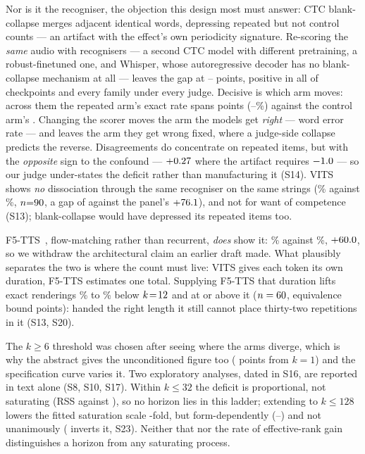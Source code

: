 Nor is it the recogniser, the objection this design most must answer: CTC
blank-collapse merges adjacent identical words, depressing repeated but not
control counts --- an artifact with the effect's own periodicity signature. Re-scoring the \emph{same} audio with
\IndNJudges{} recognisers --- a second CTC model with different
pretraining, a robust-finetuned one, and Whisper, whose autoregressive decoder
has no blank-collapse mechanism at all --- leaves the gap at
\IndGapLo{}--\IndGapHi{} points, positive in all \IndNCkPos{} of \IndNCk{}
checkpoints and every family under every judge. Decisive is which arm moves:
across them the repeated arm's exact rate spans \IndRepSpread{} points
(\IndRepLo{}--\IndRepHi{}\%) against the control arm's \IndCtlSpread{}.
Changing the scorer moves the arm the models get \emph{right} --- word error
rate --- and leaves the arm they get wrong fixed, where a judge-side collapse
predicts the reverse. Disagreements do concentrate on repeated items, but with
the \emph{opposite} sign to the confound --- $+0.27{}$ where the artifact
requires $-1.0{}$ --- so our judge under-states the deficit rather
than manufacturing it (S14). VITS~\cite{kim2021vits} shows \emph{no} dissociation
through the same recogniser on the same strings (\VitsRep{}\% against
\VitsCtl{}\%, $n{=}90{}$, a gap of \VitsGap{} against the panel's
$+76.1{}$), and not for want of competence (S13); blank-collapse would
have depressed its repeated items too.

F5-TTS~\cite{chen2024f5tts}, flow-matching rather than recurrent, \emph{does}
show it: \FivettsRep{}\% against \FivettsCtl{}\%, $+60.0{}$, so we
withdraw the architectural claim an earlier draft made. What plausibly separates
the two is where the count must live: VITS gives each token its own duration,
F5-TTS estimates one total. Supplying F5-TTS that duration lifts exact
renderings \DurLoFree{}\% to \DurLoFixed{}\% below $k\!=\!12{}$ and
\DurHiGain{} at or above it ($n=60{}$, equivalence bound
\EqDurBound{} points): handed the right length it still cannot place thirty-two repetitions
in it (S13, S20).

\begin{table}[t]
\centering
\caption{Panel summary, $k\ge6$ under the CTC judge. Count error is the median
$(\hat c-k)/k$; \emph{exactly right} is the fraction of generations whose
rendered count equals the requested one.}
\label{tab:models}
{\scriptsize\setlength{\tabcolsep}{3pt}}
\end{table}

The $k\!\ge\!6$ threshold was chosen after seeing where the arms diverge, which
is why the abstract gives the unconditioned figure too (\FullLadderGap{} points
from $k\!=\!1$) and the specification curve varies it. Two exploratory analyses, dated in S16, are reported in
text alone (S8, S10, S17). Within $k\le32$ the deficit is proportional, not
saturating (RSS \ShapePropSSE{} against \ShapeSatSSE{}), so no horizon lies in
this ladder; extending to $k\!\le\!128$ lowers the fitted saturation
scale \HzRatio{}-fold, but form-dependently (\HzFormLo{}--\HzFormHi{}) and not
unanimously (\HzRevNames{} inverts it, S23). Neither that nor the rate of
effective-rank gain distinguishes a horizon from any saturating process.
